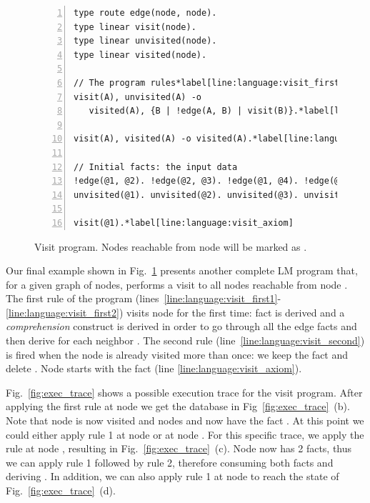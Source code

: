 
\begin{figure}[h!]
\begin{Verbatim}[numbers=left,fontsize=\codesize,commandchars=\*\[\]]
type route edge(node, node).
type linear visit(node).
type linear unvisited(node).
type linear visited(node).

// The program rules*label[line:language:visit_first1]
visit(A), unvisited(A) -o
   visited(A), {B | !edge(A, B) | visit(B)}.*label[line:language:visit_first2]*label[line:language:visit_comprehension]

visit(A), visited(A) -o visited(A).*label[line:language:visit_second]

// Initial facts: the input data
!edge(@1, @2). !edge(@2, @3). !edge(@1, @4). !edge(@2, @4).
unvisited(@1). unvisited(@2). unvisited(@3). unvisited(@4).

visit(@1).*label[line:language:visit_axiom]
\end{Verbatim}
  \caption{Visit program. Nodes reachable from node  will be marked
     as .}
  \label{code:visit}
\end{figure}

Our final example shown in Fig.~\ref{code:visit} presents another complete LM
program that, for a given graph of nodes, performs a visit to all nodes
reachable from node .  The first rule of the program
(lines~\ref{line:language:visit_first1}-\ref{line:language:visit_first2}) visits
node  for the first time: fact  is derived and a
\emph{comprehension} construct is derived in order to go through all the edge
facts and then derive  for each neighbor .  The
second rule (line~\ref{line:language:visit_second}) is fired when the node is
already visited more than once: we keep the  fact and delete
. Node  starts with the  fact (line
\ref{line:language:visit_axiom}).

Fig.~\ref{fig:exec_trace} shows a possible execution trace for the visit
program.  After applying the first rule at node  we get the database
in Fig~\ref{fig:exec_trace}~(b).  Note that node  is now visited and
nodes  and  now have the fact . At this
point we could either apply rule 1 at node  or at node .
For this specific trace, we apply the rule at node , resulting in
Fig.~\ref{fig:exec_trace}~(c). Node  now has 2 
facts, thus we can apply rule 1 followed by rule 2, therefore consuming both
 facts and deriving . In addition, we can also
apply rule 1 at node  to reach the state of
Fig.~\ref{fig:exec_trace}~(d).


